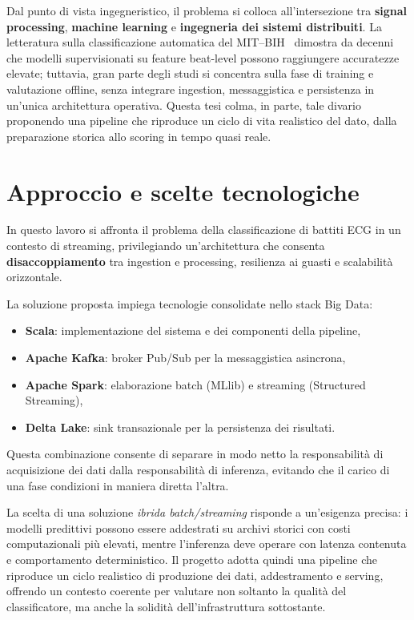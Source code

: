 Dal punto di vista ingegneristico, il problema si colloca all'intersezione tra \textbf{signal processing}, \textbf{machine learning} e \textbf{ingegneria dei sistemi distribuiti}.
La letteratura sulla classificazione automatica del MIT--BIH~\cite{moody2001impact,dechazal2004automatic} dimostra da decenni che modelli supervisionati su feature beat-level possono raggiungere accuratezze elevate; tuttavia, gran parte degli studi si concentra sulla fase di training e valutazione offline, senza integrare ingestion, messaggistica e persistenza in un'unica architettura operativa.
Questa tesi colma, in parte, tale divario proponendo una pipeline che riproduce un ciclo di vita realistico del dato, dalla preparazione storica allo scoring in tempo quasi reale.

\section{Approccio e scelte tecnologiche}\label{sec:approccio-e-scelte-tecnologiche}
In questo lavoro si affronta il problema della classificazione di battiti ECG in un contesto di streaming, privilegiando un'architettura che consenta \textbf{disaccoppiamento} tra ingestion e processing, resilienza ai guasti e scalabilità orizzontale.

La soluzione proposta impiega tecnologie consolidate nello stack Big Data:
\begin{itemize}
  \item \textbf{Scala}: implementazione del sistema e dei componenti della pipeline,
  \item \textbf{Apache Kafka}: broker Pub/Sub per la messaggistica asincrona,
  \item \textbf{Apache Spark}: elaborazione batch (MLlib) e streaming (Structured Streaming),
  \item \textbf{Delta Lake}: sink transazionale per la persistenza dei risultati.
\end{itemize}

Questa combinazione consente di separare in modo netto la responsabilità di acquisizione dei dati dalla responsabilità di inferenza, evitando che il carico di una fase condizioni in maniera diretta l'altra.

La scelta di una soluzione \emph{ibrida batch/streaming} risponde a un'esigenza precisa: i modelli predittivi possono essere addestrati su archivi storici con costi computazionali più elevati, mentre l'inferenza deve operare con latenza contenuta e comportamento deterministico.
Il progetto adotta quindi una pipeline che riproduce un ciclo realistico di produzione dei dati, addestramento e serving, offrendo un contesto coerente per valutare non soltanto la qualità del classificatore, ma anche la solidità dell'infrastruttura sottostante.

